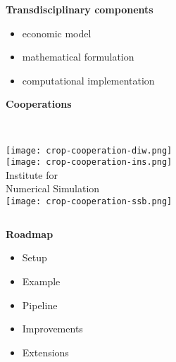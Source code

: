   \begin{frame}\textbf{Transdisciplinary components}\vspace{0.3cm}

  \begin{itemize}\setlength\itemsep{1em}
  \item economic model
  \item mathematical formulation
  \item computational implementation
  \end{itemize}
  \end{frame}
  \begin{frame}
  \textbf{Cooperations}\vspace{0.5cm}
  \begin{columns}[t]
  	\centering \\
  	\texttt{[image: crop-cooperation-diw.png]}\\
  	\vspace{1.0cm}
  	\texttt{[image: crop-cooperation-ins.png]} \\
  	\vspace{-0.5cm}
  	\footnotesize{Institute for \\ Numerical Simulation}
  	\centering \\
  	\texttt{[image: crop-cooperation-ssb.png]} \\
  	\vspace{-0.2cm}
  \end{columns}
  \end{frame}
\begin{frame}
\textbf{Roadmap}\vspace{0.5cm}
\begin{itemize}\setlength\itemsep{1em}
\item Setup
\item Example
\item Pipeline
\item Improvements
\item Extensions
\end{itemize}
\end{frame}

